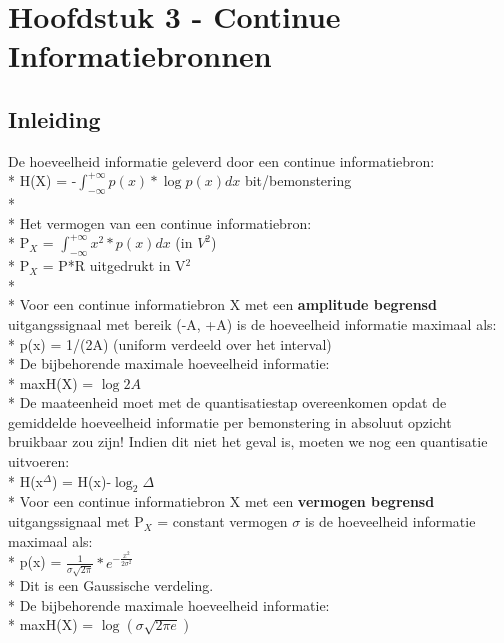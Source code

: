 \documentclass[10pt]{article}
\begin{document}
\section{Hoofdstuk 3 - Continue Informatiebronnen}
\subsection{Inleiding}
De hoeveelheid informatie geleverd door een continue informatiebron:\\*
H(X) = -$\int_{-\infty}^{+\infty} p(x)*\log p(x)dx$ bit/bemonstering\\*\\*
Het vermogen van een continue informatiebron:\\*
P$_X$ = $\int_{-\infty}^{+\infty} x^2*p(x)dx$ (in $V^2$)\\*
{\scriptsize P$_X$ = P*R uitgedrukt in V$^2$}\\*\\*
Voor een continue informatiebron X met een {\bf amplitude begrensd} uitgangssignaal met bereik (-A, +A) is de hoeveelheid informatie maximaal als:\\*
p(x) = 1/(2A) (uniform verdeeld over het interval)\\*
De bijbehorende maximale hoeveelheid informatie:\\*
maxH(X) = $\log 2A$\\*
De maateenheid moet met de quantisatiestap overeenkomen opdat de gemiddelde hoeveelheid informatie per bemonstering in absoluut opzicht bruikbaar zou zijn! Indien dit niet het geval is, moeten we nog een quantisatie uitvoeren:\\*
H(x$^\Delta$) = H(x)-$\log_2 \Delta$\\*
Voor een continue informatiebron X met een {\bf vermogen begrensd} uitgangssignaal met P$_X$ = constant vermogen $\sigma$ is de hoeveelheid informatie maximaal als:\\*
p(x) = $\frac{1}{\sigma\sqrt{2\pi}}*e^{-\frac{x^2}{2\sigma^2}}$\\*
{\scriptsize Dit is een Gaussische verdeling.}\\*
De bijbehorende maximale hoeveelheid informatie:\\*
maxH(X) = $\log(\sigma\sqrt{2\pi e})$
\end{document}
